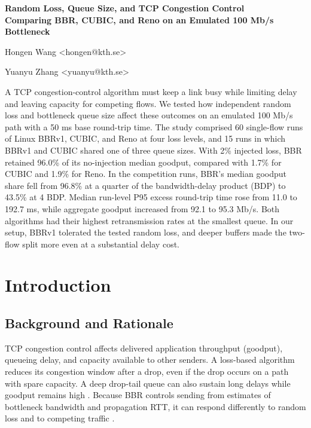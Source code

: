 \documentclass[11pt,a4paper]{article}
\newcommand{\unnumberedheading}[1]{%
  \par\vspace{2pt}{\fontsize{14}{16.5}\selectfont\bfseries #1\par}\vspace{6pt}%
}
\newcommand{\reporttitle}[1]{%
  {\fontsize{16}{19}\selectfont\bfseries #1\par}\vspace{12pt}%
}
\begin{document}
\reporttitle{Random Loss, Queue Size, and TCP Congestion Control\\[5pt]
{\fontsize{14}{17}\selectfont Comparing BBR, CUBIC, and Reno on an Emulated 100 Mb/s Bottleneck}}
\unnumberedheading{Authors}
Hongen Wang \textless hongen@kth.se\textgreater\par
Yuanyu Zhang \textless yuanyu@kth.se\textgreater\par
\vspace{2pt}

\unnumberedheading{Abstract}

A TCP congestion-control algorithm must keep a link busy while limiting delay and leaving capacity for competing flows. We tested how independent random loss and bottleneck queue size affect these outcomes on an emulated 100 Mb/s path with a 50 ms base round-trip time. The study comprised 60 single-flow runs of Linux BBRv1, CUBIC, and Reno at four loss levels, and 15 runs in which BBRv1 and CUBIC shared one of three queue sizes. With 2\% injected loss, BBR retained 96.0\% of its no-injection median goodput, compared with 1.7\% for CUBIC and 1.9\% for Reno. In the competition runs, BBR's median goodput share fell from 96.8\% at a quarter of the bandwidth-delay product (BDP) to 43.5\% at 4 BDP. Median run-level P95 excess round-trip time rose from 11.0 to 192.7 ms, while aggregate goodput increased from 92.1 to 95.3 Mb/s. Both algorithms had their highest retransmission rates at the smallest queue. In our setup, BBRv1 tolerated the tested random loss, and deeper buffers made the two-flow split more even at a substantial delay cost.

\newpage

\section{Introduction}

\subsection{Background and Rationale}

TCP congestion control affects delivered application throughput (goodput), queueing delay, and capacity available to other senders. A loss-based algorithm reduces its congestion window after a drop, even if the drop occurs on a path with spare capacity. A deep drop-tail queue can also sustain long delays while goodput remains high \cite{allman2009,xu2023,gettys2012}. Because BBR controls sending from estimates of bottleneck bandwidth and propagation RTT, it can respond differently to random loss and to competing traffic \cite{cardwell2017}.
\end{document}
